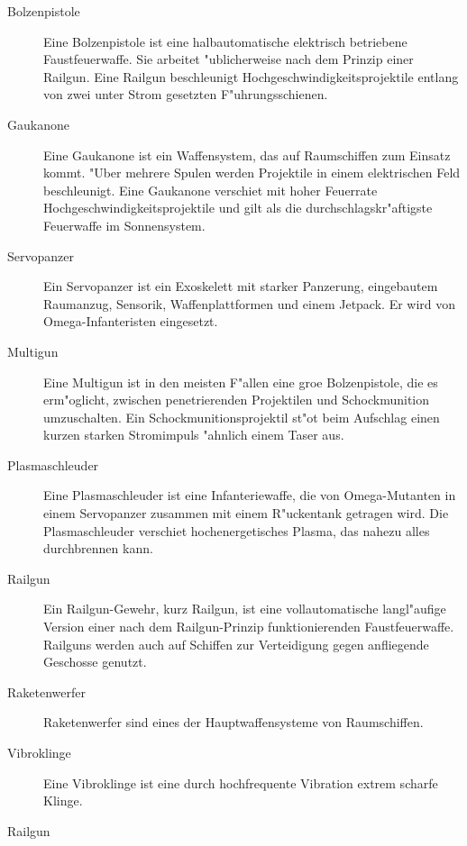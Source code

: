 \begin{description}
\item [Bolzenpistole] Eine Bolzenpistole ist eine halbautomatische elektrisch betriebene Faustfeuerwaffe. Sie arbeitet "ublicherweise nach 
      dem Prinzip einer Railgun. Eine Railgun beschleunigt Hochgeschwindigkeitsprojektile entlang von zwei unter Strom gesetzten F"uhrungsschienen.
\item [Gau\3kanone] Eine Gau\3kanone ist ein Waffensystem, das auf Raumschiffen zum Einsatz kommt. "Uber mehrere Spulen werden Projektile in 
      einem elektrischen Feld beschleunigt. Eine Gau\3kanone verschie\3t mit hoher Feuerrate Hochgeschwindigkeitsprojektile und gilt als die durchschlagskr"aftigste Feuerwaffe im Sonnensystem.
\item [Servopanzer] Ein Servopanzer ist ein Exoskelett mit starker Panzerung, eingebautem Raumanzug, Sensorik, Waffenplattformen und einem 
      Jetpack. Er wird von Omega-Infanteristen eingesetzt.
\item [Multigun] Eine Multigun ist in den meisten F"allen eine gro\3e Bolzenpistole, die es erm"oglicht, zwischen penetrierenden Projektilen 
      und Schockmunition umzuschalten. Ein Schockmunitionsprojektil st"o\3t beim Aufschlag einen kurzen starken Stromimpuls "ahnlich einem Taser aus.
\item [Plasmaschleuder] Eine Plasmaschleuder ist eine Infanteriewaffe, die von Omega-Mutanten in einem Servopanzer zusammen mit einem 
      R"uckentank getragen wird. Die Plasmaschleuder verschie\3t hochenergetisches Plasma, das nahezu alles durchbrennen kann.
\item [Railgun] Ein Railgun-Gewehr, kurz Railgun, ist eine vollautomatische langl"aufige Version einer nach dem Railgun-Prinzip      
      funktionierenden Faustfeuerwaffe. Railguns werden auch auf Schiffen zur Verteidigung gegen anfliegende Geschosse genutzt.
\item [Raketenwerfer] Raketenwerfer sind eines der Hauptwaffensysteme von Raumschiffen.
\item [Vibroklinge] Eine Vibroklinge ist eine durch hochfrequente Vibration extrem scharfe Klinge.
\end{description}

\begin{figure*}[htbp]
      \centering
      \newline{}Railgun
      \label{fig:rail-gun}
\end{figure*}